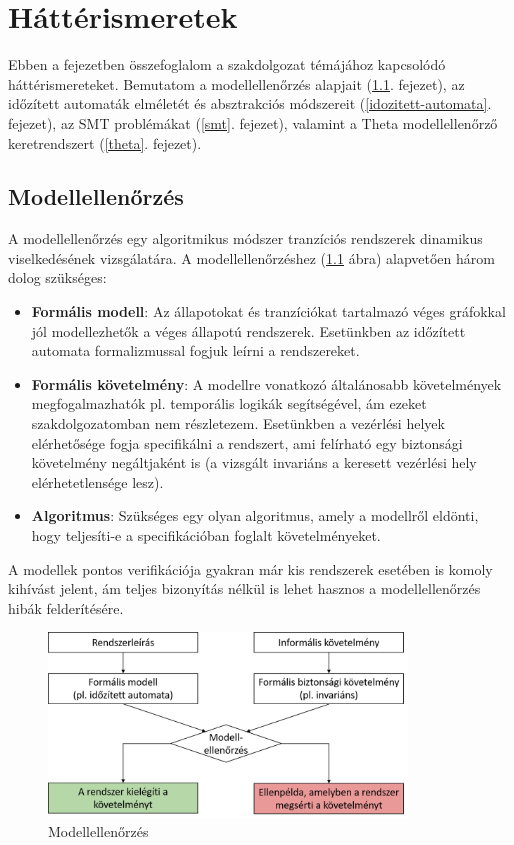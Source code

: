 
\chapter{Háttérismeretek} \label{hatterismeretek}

Ebben a fejezetben összefoglalom a szakdolgozat témájához kapcsolódó háttérismereteket. Bemutatom a modellellenőrzés alapjait (\ref{modellellenorzes}. fejezet), az időzített automaták elméletét és absztrakciós módszereit (\ref{idozitett-automata}. fejezet), az SMT problémákat (\ref{smt}. fejezet), valamint a Theta modellellenőrző keretrendszert (\ref{theta}. fejezet).

\section{Modellellenőrzés} \label{modellellenorzes}

A modellellenőrzés \cite{IntroductionToModelChecking} egy algoritmikus módszer tranzíciós rendszerek dinamikus viselkedésének vizsgálatára. A modellellenőrzéshez (\ref{fig:modell-ell} ábra) alapvetően három dolog szükséges:
\begin{itemize}
    \item \textbf{Formális modell}: Az állapotokat és tranzíciókat tartalmazó véges gráfokkal jól modellezhetők a véges állapotú rendszerek. Esetünkben az időzített automata formalizmussal fogjuk leírni a rendszereket.
    \item \textbf{Formális követelmény}: A modellre vonatkozó általánosabb követelmények megfogalmazhatók pl. temporális logikák \cite{IntroductionToModelChecking} segítségével, ám ezeket szakdolgozatomban nem részletezem. Esetünkben a vezérlési helyek elérhetősége fogja specifikálni a rendszert, ami felírható egy biztonsági követelmény negáltjaként is (a vizsgált invariáns a keresett vezérlési hely elérhetetlensége lesz).
    \item \textbf{Algoritmus}: Szükséges egy olyan algoritmus, amely a modellről eldönti, hogy teljesíti-e a specifikációban foglalt követelményeket.
\end{itemize}

A modellek pontos verifikációja gyakran már kis rendszerek esetében is komoly kihívást jelent, ám teljes bizonyítás nélkül is lehet hasznos a modellellenőrzés hibák felderítésére.

\begin{figure}
    \centering
    \includegraphics[width=0.85\textwidth, keepaspectratio]{figures/modellell.png}
    \caption{Modellellenőrzés}
    \label{fig:modell-ell}
\end{figure}

